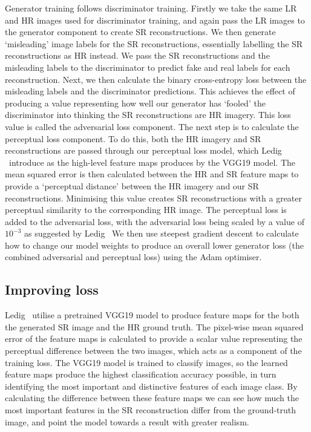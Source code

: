 Generator training follows discriminator training. Firstly we take the same LR and HR images used for discriminator training, and again pass the LR images to the generator component to create SR reconstructions. We then generate `misleading' image labels for the SR reconstructions, essentially labelling the SR reconstructions as HR instead. We pass the SR reconstructions and the misleading labels to the discriminator to predict fake and real labels for each reconstruction. Next, we then calculate the binary cross-entropy loss between the misleading labels and the discriminator predictions. This achieves the effect of producing a value representing how well our generator has `fooled' the discriminator into thinking the SR reconstructions are HR imagery. This loss value is called the adversarial loss component. The next step is to calculate the perceptual loss component. To do this, both the HR imagery and SR reconstructions are passed through our perceptual loss model, which Ledig \etal\ introduce as the high-level feature maps produces by the VGG19 model. The mean squared error is then calculated between the HR and SR feature maps to provide a `perceptual distance' between the HR imagery and our SR reconstructions. Minimising this value creates SR reconstructions with a greater perceptual similarity to the corresponding HR image. The perceptual loss is added to the adversarial loss, with the adversarial loss being scaled by a value of $10^{-3}$ as suggested by Ledig \etal\ We then use steepest gradient descent to calculate how to change our model weights to produce an overall lower generator loss (the combined adversarial and perceptual loss) using the Adam optimiser.

\subsection{Improving loss}\label{subsec:improving_loss}
Ledig \etal\ utilise a pretrained VGG19 model to produce feature maps for the both the generated SR image and the HR ground truth. The pixel-wise mean squared error of the feature maps is calculated to provide a scalar value representing the perceptual difference between the two images, which acts as a component of the training loss. The VGG19 model is trained to classify images, so the learned feature maps produce the highest classification accuracy possible, in turn identifying the most important and distinctive features of each image class. By calculating the difference between these feature maps we can see how much the most important features in the SR reconstruction differ from the ground-truth image, and point the model towards a result with greater realism.


